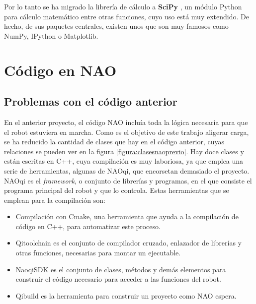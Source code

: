 \documentclass[12pt,spanish,listoffigures,listoftables]{tfgetsinf}
\begin{document}
Por lo tanto se ha migrado la librería de cálculo a \textbf{SciPy} \cite{Scipy}, un módulo Python para cálculo matemático entre otras funciones, cuyo uso está muy extendido. De hecho, de sus paquetes centrales, existen unos que son muy famosos como NumPy, IPython o Matplotlib.

\chapter{Código en NAO}

\section{Problemas con el código anterior}

En el anterior proyecto, el código NAO incluía toda la lógica necesaria para que el robot estuviera en marcha. Como es el objetivo de este trabajo aligerar carga, se ha reducido la cantidad de clases que hay en el código anterior, cuyas relaciones se pueden ver en la figura \ref{figura:clasesnaoprevio}. Hay doce clases y están escritas en C++, cuya compilación es muy laboriosa, ya que emplea una serie de herramientas, algunas de NAOqi, que encorsetan demasiado el proyecto. NAOqi es el \textit{framework}, o conjunto de librerías y programas, en el que consiste el programa principal del robot y que lo controla. Estas herramientas que se emplean para la compilación son:
\begin{itemize}
	\item Compilación con Cmake, una herramienta que ayuda a la compilación de código en C++, para automatizar este proceso.
	\item Qitoolchain es el conjunto de compilador cruzado, enlazador de librerías y otras funciones, necesarias para montar un ejecutable.
	\item NaoqiSDK es el conjunto de clases, métodos y demás elementos para construir el código necesario para acceder a las funciones del robot.
	\item Qibuild es la herramienta para construir un proyecto como NAO espera.
\end{itemize}
\end{document}
